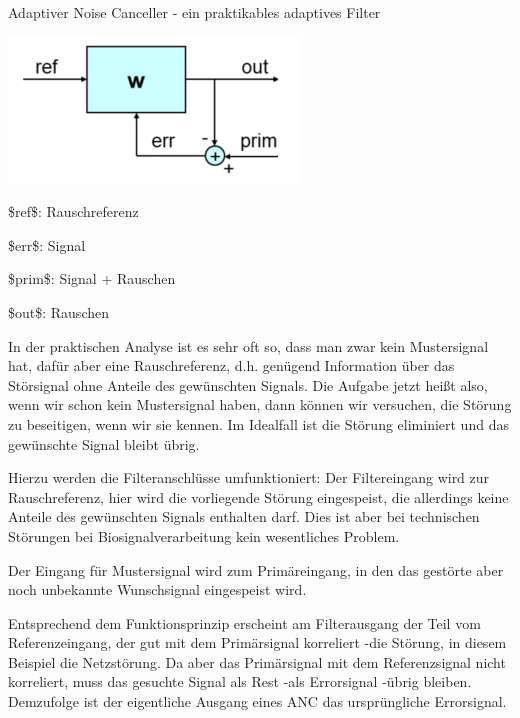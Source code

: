 \documentclass[a4paper]{article}
\begin{document}
\begin{multicols}{3}
  Adaptiver Noise Canceller - ein praktikables adaptives Filter

  \begin{itemize*}
    \item \includegraphics[width=.5\linewidth]{Assets/Biosignalverarbeitung-adaptiver-filter-noise-canceller.png}
    \item \$ref\$: Rauschreferenz
    \item \$err\$: Signal
    \item \$prim\$: Signal + Rauschen
    \item \$out\$: Rauschen
    \item In der praktischen Analyse ist es sehr oft so, dass man zwar kein Mustersignal hat, dafür aber eine Rauschreferenz, d.h. genügend Information über das Störsignal ohne Anteile des gewünschten Signals. Die Aufgabe jetzt heißt also, wenn wir schon kein Mustersignal haben, dann können wir versuchen, die Störung zu beseitigen, wenn wir sie kennen. Im Idealfall ist die Störung eliminiert und das gewünschte Signal bleibt übrig.
    \item Hierzu werden die Filteranschlüsse umfunktioniert: Der Filtereingang wird zur Rauschreferenz, hier wird die vorliegende Störung eingespeist, die allerdings keine Anteile des gewünschten Signals enthalten darf. Dies ist aber bei technischen Störungen bei Biosignalverarbeitung kein wesentliches Problem.
    \item Der Eingang für Mustersignal wird zum Primäreingang, in den das gestörte aber noch unbekannte Wunschsignal eingespeist wird.
    \item Entsprechend dem Funktionsprinzip erscheint am Filterausgang der Teil vom Referenzeingang, der gut mit dem Primärsignal korreliert -die Störung, in diesem Beispiel die Netzstörung. Da aber das Primärsignal mit dem Referenzsignal nicht korreliert, muss das gesuchte Signal als Rest -als Errorsignal -übrig bleiben. Demzufolge ist der eigentliche Ausgang eines ANC das ursprüngliche Errorsignal.

\end{itemize*}
\end{multicols}
\end{document}
